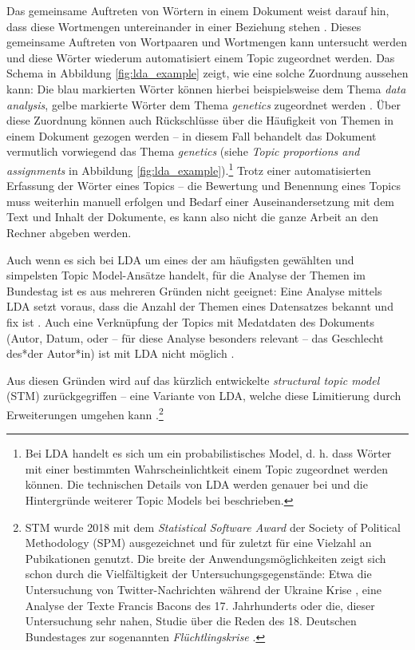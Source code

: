 \documentclass[12pt, 
    twoside=false, 
    bibliography=totoc, 
    numbers=endperiod, 
    headings=normal, 
    toc=chapterentrydotfill
    ]{scrbook}
\begin{document}
Das gemeinsame Auftreten von Wörtern in einem Dokument weist darauf hin, dass diese Wortmengen untereinander in einer Beziehung stehen \parencite[90]{niekler_2018}. Dieses gemeinsame Auftreten von Wortpaaren und Wortmengen kann untersucht werden und diese Wörter wiederum automatisiert einem Topic zugeordnet werden. Das Schema in Abbildung \ref{fig:lda_example} zeigt, wie eine solche Zuordnung aussehen kann: Die blau markierten Wörter können hierbei beispielsweise dem Thema \emph{data analysis}, gelbe markierte Wörter dem Thema \emph{genetics} zugeordnet werden \parencite[vgl.][78]{blei_2012}. Über diese Zuordnung können auch Rückschlüsse über die Häufigkeit von Themen in einem Dokument gezogen werden -- in diesem Fall behandelt das Dokument vermutlich vorwiegend das Thema \emph{genetics} (siehe \emph{Topic proportions and assignments} in Abbildung \ref{fig:lda_example}).\footnote{Bei LDA handelt es sich um ein probabilistisches Model, d. h. dass Wörter mit einer bestimmten Wahrscheinlichtkeit einem Topic zugeordnet werden können. Die technischen Details von LDA werden genauer bei \textcite{blei_2012} und die Hintergründe weiterer Topic Models bei \textcite[87ff.]{niekler_2018} beschrieben.} Trotz einer automatisierten Erfassung der Wörter eines Topics -- die Bewertung und Benennung eines Topics muss weiterhin manuell erfolgen und Bedarf einer Auseinandersetzung mit dem Text und Inhalt der Dokumente, es kann also nicht die ganze Arbeit an den Rechner abgeben werden.

Auch wenn es sich bei LDA um eines der am häufigsten gewählten und simpelsten Topic Model-Ansätze handelt, für die Analyse der Themen im Bundestag ist es aus mehreren Gründen nicht geeignet:
Eine Analyse mittels LDA setzt voraus, dass die Anzahl der Themen eines Datensatzes bekannt und fix ist \parencites[93]{niekler_2018}[82f.]{blei_2012}. Auch eine Verknüpfung der Topics mit Medatdaten des Dokuments (Autor, Datum, oder -- für diese Analyse besonders relevant -- das Geschlecht des*der Autor*in) ist mit LDA nicht möglich \parencites[94]{niekler_2018}[82f.]{blei_2012}. 

Aus diesen Gründen wird auf das kürzlich entwickelte \emph{structural topic model} (STM) zurückgegriffen -- eine Variante von LDA, welche diese Limitierung durch Erweiterungen umgehen kann \parencite[640]{mishler_2015}.\footnote{STM wurde 2018 mit dem \emph{Statistical Software Award} der {Society of Political Methodology} (SPM) ausgezeichnet und für zuletzt für eine Vielzahl an Pubikationen genutzt. Die breite der Anwendungsmöglichkeiten zeigt sich schon durch die Vielfältigkeit der Untersuchungsgegenstände: Etwa die Untersuchung von Twitter-Nachrichten während der Ukraine Krise \parencite{mishler_2015}, eine Analyse der Texte Francis Bacons des 17. Jahrhunderts \parencite{grajzl_2019} oder die, dieser Untersuchung sehr nahen, Studie über die Reden des 18. Deutschen Bundestages zur sogenannten \emph{Flüchtlingskrise} \parencite{geese_2019}.}
\end{document}
